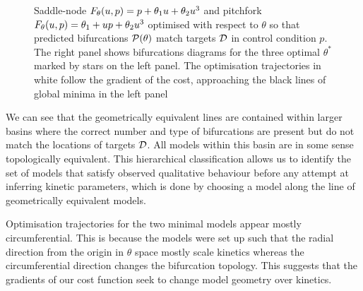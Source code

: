 \documentclass{article}
\begin{document}
\begin{figure}[ht]
\caption{Saddle-node $F_{\theta}(u,p) = p + \theta_{1}u+\theta_{2}u^3$ and pitchfork $F_{\theta}(u,p) = \theta_{1} + u p +\theta_{2}u^3$ optimised with respect to $\theta$ so that predicted bifurcations $\mathcal{P}(\theta)$ match targets $\mathcal{D}$ in control condition $p$. The right panel shows bifurcations diagrams for the three optimal $\theta^*$ marked by stars on the left panel. The optimisation trajectories in white follow the gradient of the cost, approaching the black lines of global minima in the left panel}
\label{fig:minimal-models:results}
\end{figure}

We can see that the geometrically equivalent lines are contained within larger basins where the correct number and type of bifurcations are present but do not match the locations of targets $\mathcal{D}$. All models within this basin are in some sense topologically equivalent. This hierarchical classification allows us to identify the set of models that satisfy observed qualitative behaviour \cite{Stumpf2019ParameterBifurcations} before any attempt at inferring kinetic parameters, which is done by choosing a model along the line of geometrically equivalent models.

Optimisation trajectories for the two minimal models appear mostly circumferential. This is because the models were set up such that the radial direction from the origin in $\theta$ space mostly scale kinetics whereas the circumferential direction changes the bifurcation topology. This suggests that the gradients of our cost function seek to change model geometry over kinetics.
\end{document}
